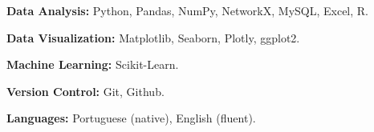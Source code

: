 \documentclass[12pt,a4paper,roman]{moderncv}        %
\begin{document}
\textbf{Data Analysis:} Python, Pandas, NumPy, NetworkX, MySQL, Excel, R.

\vspace{6pt}

\textbf{Data Visualization:} Matplotlib, Seaborn, Plotly, ggplot2.

\vspace{6pt}

\textbf{Machine Learning:} Scikit-Learn.

\vspace{6pt}

\textbf{Version Control:} Git, Github.

\vspace{6pt}

\textbf{Languages:} Portuguese (native), English (fluent).

%
%
%
%
%
%
%
%
\end{document}

